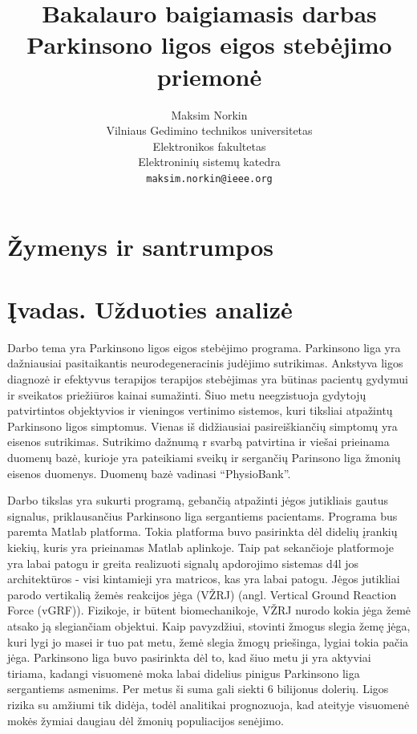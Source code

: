 \documentclass[]{vgtuef}
\author{Maksim Norkin\\Vilniaus Gedimino technikos
  universitetas\\Elektronikos fakultetas\\Elektroninių sistemų
  katedra\\\texttt{maksim.norkin@ieee.org}}
\title{Bakalauro baigiamasis darbas\\Parkinsono ligos eigos stebėjimo priemonė}
\begin{document}
\setcounter{page}{7}


\onehalfspacing

\tableofcontents

\section*{Žymenys ir santrumpos}

\section{Įvadas. Užduoties analizė}

Darbo tema yra Parkinsono ligos eigos stebėjimo programa. Parkinsono
liga yra dažniausiai pasitaikantis neurodegeneracinis judėjimo
sutrikimas. Ankstyva ligos diagnozė ir efektyvus terapijos terapijos
stebėjimas yra būtinas pacientų gydymui ir sveikatos priežiūros kainai
sumažinti. Šiuo metu neegzistuoja gydytojų patvirtintos objektyvios ir
vieningos vertinimo sistemos, kuri tiksliai atpažintų Parkinsono ligos
simptomus. Vienas iš didžiausiai pasireiškiančių simptomų yra eisenos
sutrikimas. Sutrikimo dažnumą r svarbą patvirtina ir viešai prieinama
duomenų bazė, kurioje yra pateikiami sveikų ir sergančių Parinsono
liga žmonių eisenos duomenys. Duomenų bazė vadinasi ``PhysioBank''.

Darbo tikslas yra sukurti programą, gebančią atpažinti jėgos
jutikliais gautus signalus, priklausančius Parkinsono liga sergantiems
pacientams. Programa bus paremta Matlab platforma. Tokia platforma
buvo pasirinkta dėl didelių įrankių kiekių, kuris yra prieinamas
Matlab aplinkoje. Taip pat sekančioje platformoje yra labai patogu ir
greita realizuoti signalų apdorojimo sistemas d4l jos architektūros -
visi kintamieji yra matricos, kas yra labai patogu. Jėgos jutikliai
parodo vertikalią žemės reakcijos jėga (VŽRJ) (angl. Vertical Ground
Reaction Force (vGRF)). Fizikoje, ir būtent biomechanikoje, VŽRJ
nurodo kokia jėga žemė atsako ją slegiančiam objektui. Kaip
pavyzdžiui, stovinti žmogus slegia žemę jėga, kuri lygi jo masei ir
tuo pat metu, žemė slegia žmogų priešinga, lygiai tokia pačia
jėga. Parkinsono liga buvo pasirinkta dėl to, kad šiuo metu ji yra
aktyviai tiriama, kadangi visuomenė moka labai didelius pinigus
Parkinsono liga sergantiems asmenims. Per metus ši suma gali siekti 6
bilijonus dolerių. Ligos rizika su amžiumi tik didėja, todėl
analitikai prognozuoja, kad ateityje visuomenė mokės žymiai daugiau
dėl žmonių populiacijos senėjimo.
\end{document}
